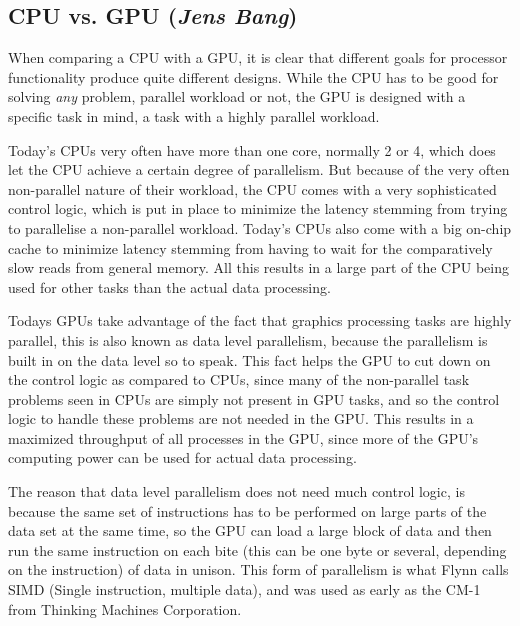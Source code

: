 \subsection{CPU vs. GPU (\textit{Jens Bang})}
When comparing a CPU with a GPU, it is clear that different goals for processor functionality produce quite different designs. While the CPU has to be good for solving \emph{any} problem, parallel workload or not, the GPU is designed with a specific task in mind, a task with a highly parallel workload.


Today's CPUs very often have more than one core, normally 2 or 4, which does let the CPU achieve a certain degree of parallelism. But because of the very often non-parallel nature of their workload, the CPU comes with a very sophisticated control logic, which is put in place to minimize the latency stemming from trying to parallelise a non-parallel workload. Today's CPUs also come with a big on-chip cache to minimize latency stemming from having to wait for the comparatively slow reads from general memory. All this results in a large part of the CPU being used for other tasks than the actual data processing.

Todays GPUs take advantage of the fact that graphics processing tasks are highly parallel, this is also known as data level parallelism, because the parallelism is built in on the data level so to speak. This fact helps the GPU to cut down on the control logic as compared to CPUs, since many of the non-parallel task problems seen in CPUs are simply not present in GPU tasks, and so the control logic to handle these problems are not needed in the GPU. This results in a maximized throughput of all processes in the GPU, since more of the GPU's computing power can be used for actual data processing.

The reason that data level parallelism does not need much control logic, is because the same set of instructions has to be performed on large parts of the data set at the same time, so the GPU can load a large block of data and then run the same instruction on each bite (this can be one byte or several, depending on the instruction) of data in unison. This form of parallelism is what Flynn calls SIMD (Single instruction, multiple data), and was used as early as the CM-1 from Thinking Machines Corporation.

